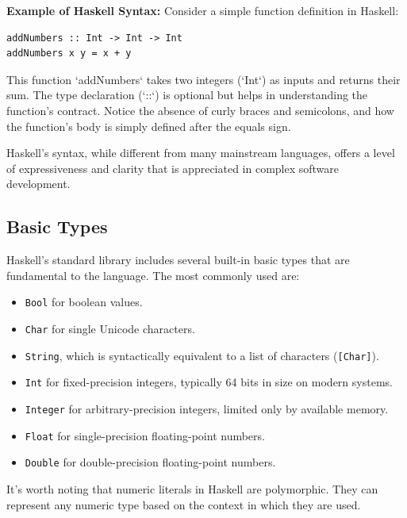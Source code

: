 \documentclass[a4paper, 10pt]{article}
\begin{document}
            \textbf{Example of Haskell Syntax:}
            Consider a simple function definition in Haskell:

            \begin{lstlisting}
addNumbers :: Int -> Int -> Int
addNumbers x y = x + y
            \end{lstlisting}

            This function `addNumbers` takes two integers (`Int`) as inputs and returns their sum. The type declaration (`::`) is optional but helps in understanding the function's contract. Notice the absence of curly braces and semicolons, and how the function's body is simply defined after the equals sign.

            Haskell's syntax, while different from many mainstream languages, offers a level of expressiveness and clarity that is appreciated in complex software development.

        \newpage
        \subsection{Basic Types}

            Haskell's standard library includes several built-in basic types that are fundamental to the language. The most commonly used are:

            \begin{itemize}
                \item \texttt{Bool} for boolean values.
                \item \texttt{Char} for single Unicode characters.
                \item \texttt{String}, which is syntactically equivalent to a list of characters (\texttt{[Char]}).
                \item \texttt{Int} for fixed-precision integers, typically 64 bits in size on modern systems.
                \item \texttt{Integer} for arbitrary-precision integers, limited only by available memory.
                \item \texttt{Float} for single-precision floating-point numbers.
                \item \texttt{Double} for double-precision floating-point numbers.
            \end{itemize}

            \noindent It's worth noting that numeric literals in Haskell are polymorphic. They can represent any numeric type based on the context in which they are used.
\end{document}
